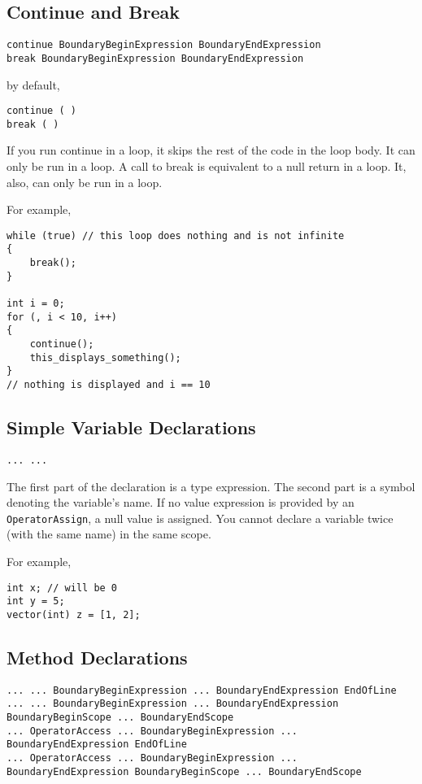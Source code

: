 \documentclass[10pt,a4paper]{article}
\begin{document}
\subsection{Continue and Break}
\label{sec:continueAndBreak}
\begin{verbatim}
continue BoundaryBeginExpression BoundaryEndExpression
break BoundaryBeginExpression BoundaryEndExpression
\end{verbatim}

by default,
\begin{verbatim}
continue ( )
break ( )
\end{verbatim}

If you run continue in a loop, it skips the rest of the code in the loop body. It can only be run in a loop. A call to break is equivalent to a null return in a loop. It, also, can only be run in a loop.

For example,
\begin{verbatim}
while (true) // this loop does nothing and is not infinite
{
    break();
}

int i = 0;
for (, i < 10, i++)
{
    continue();
    this_displays_something();
}
// nothing is displayed and i == 10
\end{verbatim}

\subsection{Simple Variable Declarations}
\label{sec:simpleVariableDeclarations}
\begin{verbatim}
... ...
\end{verbatim}

The first part of the declaration is a type expression. The second part is a symbol denoting the variable's name. If no value expression is provided by an \verb|OperatorAssign|, a null value is assigned. You cannot declare a variable twice (with the same name) in the same scope.

For example,
\begin{verbatim}
int x; // will be 0
int y = 5;
vector(int) z = [1, 2];
\end{verbatim}

\subsection{Method Declarations}
\label{sec:methodDeclarations}
\begin{verbatim}
... ... BoundaryBeginExpression ... BoundaryEndExpression EndOfLine
... ... BoundaryBeginExpression ... BoundaryEndExpression BoundaryBeginScope ... BoundaryEndScope
... OperatorAccess ... BoundaryBeginExpression ... BoundaryEndExpression EndOfLine
... OperatorAccess ... BoundaryBeginExpression ... BoundaryEndExpression BoundaryBeginScope ... BoundaryEndScope
\end{verbatim}
\end{document}

